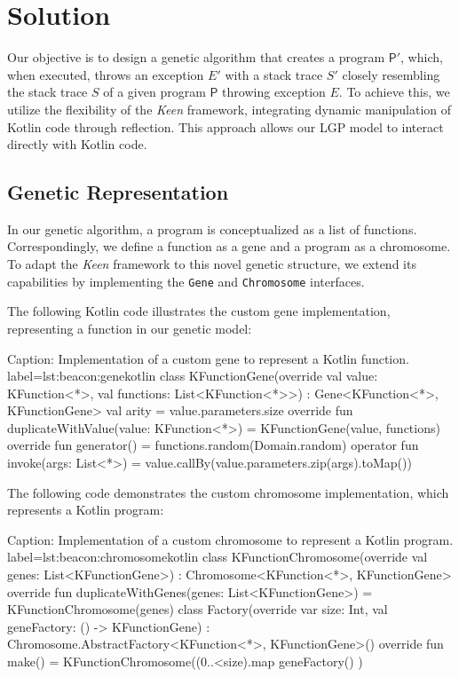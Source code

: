 \section{Solution}
\label{sec:solution}

    Our objective is to design a genetic algorithm that creates a program \(\mathsf{P'}\), which, when executed, 
    throws an exception \(E'\) with a stack trace \(S'\) closely resembling the stack trace \(S\) of a given 
    program \(\mathsf{P}\) throwing exception \(E\). To achieve this, we utilize the flexibility of the \textit{Keen} 
    framework, integrating dynamic manipulation of Kotlin code through reflection. This approach allows our LGP model to
    interact directly with Kotlin code.

    \subsection{Genetic Representation}
        In our genetic algorithm, a program is conceptualized as a list of functions. Correspondingly, we define 
        a function as a gene and a program as a chromosome. To adapt the \textit{Keen} framework to this novel genetic 
        structure, we extend its capabilities by implementing the \texttt{Gene} and \texttt{Chromosome} interfaces.

        The following Kotlin code illustrates the custom gene implementation, representing a function in our genetic model:
        \begin{code}{
            Caption: Implementation of a custom gene to represent a Kotlin function.
        }{label=lst:beacon:gene}{kotlin}
            class KFunctionGene(override val value: KFunction<*>, val functions: List<KFunction<*>>) :
                Gene<KFunction<*>, KFunctionGene> {
                val arity = value.parameters.size
                override fun duplicateWithValue(value: KFunction<*>) = KFunctionGene(value, functions)
                override fun generator() = functions.random(Domain.random)
                operator fun invoke(args: List<*>) = value.callBy(value.parameters.zip(args).toMap())
            }
        \end{code}

        The following code demonstrates the custom chromosome implementation, which represents a Kotlin program:
        \begin{code}{
            Caption: Implementation of a custom chromosome to represent a Kotlin program.
        }{label=lst:beacon:chromosome}{kotlin}
            class KFunctionChromosome(override val genes: List<KFunctionGene>) 
                : Chromosome<KFunction<*>, KFunctionGene> {
                override fun duplicateWithGenes(genes: List<KFunctionGene>) = KFunctionChromosome(genes)
                class Factory(override var size: Int, val geneFactory: () -> KFunctionGene) :
                    Chromosome.AbstractFactory<KFunction<*>, KFunctionGene>() {
                    override fun make() = KFunctionChromosome((0..<size).map { geneFactory() })
                }
            }
        \end{code}

